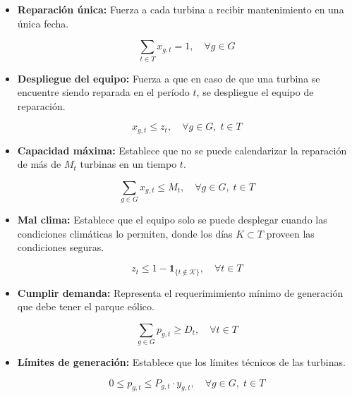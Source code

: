 \begin{itemize}

    \item \textbf{Reparación única:} Fuerza a cada turbina a recibir mantenimiento en una
    única fecha.

    \begin{equation}
        \sum_{t \in T} x_{g,t} = 1,
        \quad \forall g \in G
    \end{equation}

    \item \textbf{Despliegue del equipo:} Fuerza a que en caso de que una turbina se encuentre
    siendo reparada en el período $t$, se despliegue el equipo de reparación.

    \begin{equation}
        x_{g,t} \leq z_t,
        \quad \forall g \in G,\; t \in T
    \end{equation}

    \item \textbf{Capacidad máxima:} Establece que no se puede calendarizar la reparación de
    más de $M_t$ turbinas en un tiempo $t$.

    \begin{equation}
        \sum_{g \in G} x_{g,t} \leq M_t,
        \quad \forall g \in G,\; t \in T
    \end{equation}

    \item \textbf{Mal clima:} Establece que el equipo solo se puede desplegar cuando las condiciones
    climáticas lo permiten, donde los días $K \subset T$ proveen las condiciones seguras.

    \begin{equation}
        z_t \leq 1 - \mathbf{1}_{\{t \notin \mathcal{K}\}},
        \quad \forall t \in T
    \end{equation}

    \item \textbf{Cumplir demanda:} Representa el requerimimiento mínimo de generación que
    debe tener el parque eólico.

    \begin{equation}
        \sum_{g \in G} p_{g,t} \geq D_t,
        \quad \forall t \in T
    \end{equation}

    \item \textbf{Límites de generación:} Establece que los límites técnicos de las turbinas.

    \begin{equation}
        0 \leq p_{g,t} \leq P_{g,t} \cdot y_{g,t},
        \quad \forall g \in G,\; t \in T
    \end{equation}


\end{itemize}

